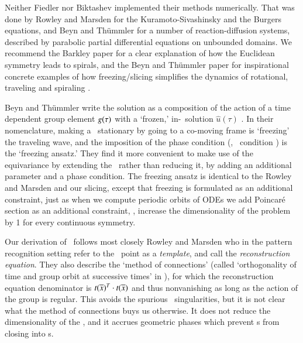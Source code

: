 \documentclass[final,number,sort&compress]{elsarticle}
\begin{document}
Neither Fiedler \etal{} nor Biktashev
\etal{} implemented their methods numerically.
That was done by Rowley and Marsden for the
Kuramoto-Sivashinsky and the
Burgers equations, and Beyn and
Th\"ummler for a number of
reaction-diffusion systems, described by parabolic partial
differential equations on unbounded domains. We recommend the
Barkley paper for a clear explanation of how
the Euclidean symmetry leads to spirals, and the Beyn and
Th\"ummler paper for inspirational concrete
examples of how freezing/\-slicing simplifies the
dynamics of rotational, traveling and spiraling \reqva.

Beyn and Th\"ummler write the solution as a composition of
the action of a time dependent group element $g(\tau)$ with
a `frozen,' in-\slice\ solution $\hat{u}(\tau)$
. In their nomenclature, making a \reqv\ stationary
by going to a co-moving frame is `freezing' the
traveling wave, and the imposition of the phase
condition (\ie, \slice\ condition ) is the
`freezing ansatz.' They find it more convenient to make use
of the equivariance by extending the \statesp\ rather than
reducing it, by adding an additional parameter and a phase
condition.
The freezing ansatz is identical
to the Rowley and Marsden and our
slicing, except that freezing is formulated as an
additional constraint, just as when we compute periodic
orbits of ODEs we add Poincar\'e section as an additional
constraint, \ie, increase the dimensionality of the problem
by 1 for every continuous symmetry.

Our derivation of \mslices\ follows most closely
Rowley and Marsden who in the
pattern recognition setting refer to the \slice\ point as a
{\em template}, and call  the {\em reconstruction
equation}. They also describe the `method
of connections' (called `orthogonality of time and group
orbit at successive times' in ), for which the
reconstruction equation  denominator is
$t(\overline{x})^T \cdot t(\overline{x})$ and thus
nonvanishing as long as the action of the group is regular.
This avoids the spurious \slice\ singularities, but it is not
clear what the method of connections buys us otherwise. It
does not reduce the dimensionality of the \statesp, and it
accrues geometric phases which prevent \rpo s from closing
into \po s.
\end{document}
